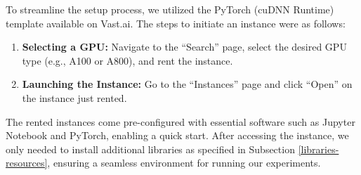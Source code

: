 To streamline the setup process, we utilized the PyTorch (cuDNN Runtime) template available on Vast.ai. The steps to initiate an instance were as follows: 
\begin{enumerate}
    \item \textbf{Selecting a GPU:} Navigate to the ``Search'' page, select the desired GPU type (e.g., A100 or A800), and rent the instance.
    \item \textbf{Launching the Instance:} Go to the ``Instances'' page and click ``Open'' on the instance just rented.
\end{enumerate}
The rented instances come pre-configured with essential software such as Jupyter Notebook and PyTorch, enabling a quick start. After accessing the instance, we only needed to install additional libraries as specified in Subsection \ref{libraries-resources}, ensuring a seamless environment for running our experiments.

